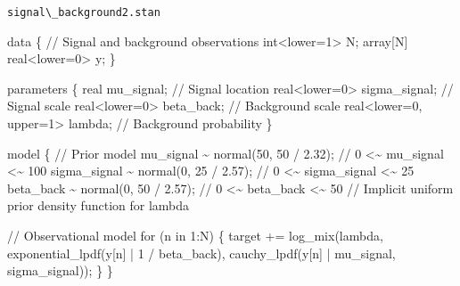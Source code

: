 \documentclass[
  letterpaper,
  DIV=11,
  numbers=noendperiod]{scrartcl}
\newenvironment{Shaded}{\begin{snugshade}}{\end{snugshade}}
\newcommand{\CommentTok}[1]{\textcolor[rgb]{0.37,0.37,0.37}{#1}}
\newcommand{\ControlFlowTok}[1]{\textcolor[rgb]{0.00,0.23,0.31}{#1}}
\newcommand{\DataTypeTok}[1]{\textcolor[rgb]{0.68,0.00,0.00}{#1}}
\newcommand{\DecValTok}[1]{\textcolor[rgb]{0.68,0.00,0.00}{#1}}
\newcommand{\FloatTok}[1]{\textcolor[rgb]{0.68,0.00,0.00}{#1}}
\newcommand{\KeywordTok}[1]{\textcolor[rgb]{0.00,0.23,0.31}{#1}}
\newcommand{\NormalTok}[1]{\textcolor[rgb]{0.00,0.23,0.31}{#1}}
\begin{document}
\begin{codelisting}

\caption{\texttt{signal\textbackslash\_background2.stan}}

\begin{Shaded}
\begin{Highlighting}[]
\KeywordTok{data}\NormalTok{ \{}
  \CommentTok{// Signal and background observations}
  \DataTypeTok{int}\NormalTok{\textless{}}\KeywordTok{lower}\NormalTok{=}\DecValTok{1}\NormalTok{\textgreater{} N;}
  \DataTypeTok{array}\NormalTok{[N] }\DataTypeTok{real}\NormalTok{\textless{}}\KeywordTok{lower}\NormalTok{=}\DecValTok{0}\NormalTok{\textgreater{} y;}
\NormalTok{\}}

\KeywordTok{parameters}\NormalTok{ \{}
  \DataTypeTok{real}\NormalTok{ mu\_signal;                }\CommentTok{// Signal location}
  \DataTypeTok{real}\NormalTok{\textless{}}\KeywordTok{lower}\NormalTok{=}\DecValTok{0}\NormalTok{\textgreater{} sigma\_signal;    }\CommentTok{// Signal scale}
  \DataTypeTok{real}\NormalTok{\textless{}}\KeywordTok{lower}\NormalTok{=}\DecValTok{0}\NormalTok{\textgreater{} beta\_back;       }\CommentTok{// Background scale}
  \DataTypeTok{real}\NormalTok{\textless{}}\KeywordTok{lower}\NormalTok{=}\DecValTok{0}\NormalTok{, }\KeywordTok{upper}\NormalTok{=}\DecValTok{1}\NormalTok{\textgreater{} lambda; }\CommentTok{// Background probability}
\NormalTok{\}}

\KeywordTok{model}\NormalTok{ \{}
  \CommentTok{// Prior model}
\NormalTok{  mu\_signal \textasciitilde{} normal(}\DecValTok{50}\NormalTok{, }\DecValTok{50}\NormalTok{ / }\FloatTok{2.32}\NormalTok{);   }\CommentTok{// 0 \textless{}\textasciitilde{} mu\_signal    \textless{}\textasciitilde{} 100}
\NormalTok{  sigma\_signal \textasciitilde{} normal(}\DecValTok{0}\NormalTok{, }\DecValTok{25}\NormalTok{ / }\FloatTok{2.57}\NormalTok{); }\CommentTok{// 0 \textless{}\textasciitilde{} sigma\_signal \textless{}\textasciitilde{}  25}
\NormalTok{  beta\_back \textasciitilde{} normal(}\DecValTok{0}\NormalTok{, }\DecValTok{50}\NormalTok{ / }\FloatTok{2.57}\NormalTok{);    }\CommentTok{// 0 \textless{}\textasciitilde{} beta\_back    \textless{}\textasciitilde{}  50}
  \CommentTok{// Implicit uniform prior density function for lambda}

  \CommentTok{// Observational model}
  \ControlFlowTok{for}\NormalTok{ (n }\ControlFlowTok{in} \DecValTok{1}\NormalTok{:N) \{}
    \KeywordTok{target +=}\NormalTok{ log\_mix(lambda,}
\NormalTok{                      exponential\_lpdf(y[n] | }\DecValTok{1}\NormalTok{ / beta\_back),}
\NormalTok{                      cauchy\_lpdf(y[n] | mu\_signal, sigma\_signal));}
\NormalTok{  \}}
\NormalTok{\}}


\end{Highlighting}
\end{Shaded}
\end{codelisting}
\end{document}
